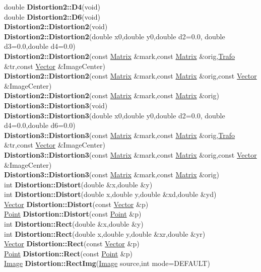 \documentclass[10pt,titlepage]{article}
\def\functionlistentry#1#2#3#4#5#6{\noindent #1 {\bf #2}(#3) \dotfill #6\\}
\begin{document}
{{\functionlistentry{double}{Distortion2::D4}{void}{757}{geoTrafo}{}
\functionlistentry{double}{Distortion2::D6}{void}{758}{geoTrafo}{}
\functionlistentry{}{Distortion2::Distortion2}{void}{730}{geoTrafo}{}
\functionlistentry{}{Distortion2::Distortion2}{double x0,double y0,double d2=0.0, double d3=0.0,double d4=0.0}{734}{geoTrafo}{}
\functionlistentry{}{Distortion2::Distortion2}{const \hyperlink{Matrix}{Matrix} \&mark,const \hyperlink{Matrix}{Matrix} \&orig,\hyperlink{Trafo}{Trafo} \&tr,const \hyperlink{Vector}{Vector} \&ImageCenter}{742}{geoTrafo}{}
\functionlistentry{}{Distortion2::Distortion2}{const \hyperlink{Matrix}{Matrix} \&mark,const \hyperlink{Matrix}{Matrix} \&orig,const \hyperlink{Vector}{Vector} \&ImageCenter}{743}{geoTrafo}{}
\functionlistentry{}{Distortion2::Distortion2}{const \hyperlink{Matrix}{Matrix} \&mark,const \hyperlink{Matrix}{Matrix} \&orig}{744}{geoTrafo}{}
\functionlistentry{}{Distortion3::Distortion3}{void}{731}{geoTrafo}{}
\functionlistentry{}{Distortion3::Distortion3}{double x0,double y0,double d2=0.0, double d4=0.0,double d6=0.0}{735}{geoTrafo}{}
\functionlistentry{}{Distortion3::Distortion3}{const \hyperlink{Matrix}{Matrix} \&mark,const \hyperlink{Matrix}{Matrix} \&orig,\hyperlink{Trafo}{Trafo} \&tr,const \hyperlink{Vector}{Vector} \&ImageCenter}{745}{geoTrafo}{}
\functionlistentry{}{Distortion3::Distortion3}{const \hyperlink{Matrix}{Matrix} \&mark,const \hyperlink{Matrix}{Matrix} \&orig,const \hyperlink{Vector}{Vector} \&ImageCenter}{746}{geoTrafo}{}
\functionlistentry{}{Distortion3::Distortion3}{const \hyperlink{Matrix}{Matrix} \&mark,const \hyperlink{Matrix}{Matrix} \&orig}{747}{geoTrafo}{}
\functionlistentry{int}{Distortion::Distort}{double \&x,double \&y}{759}{geoTrafo}{}
\functionlistentry{int}{Distortion::Distort}{double x,double y,double \&xd,double \&yd}{760}{geoTrafo}{}
\functionlistentry{\hyperlink{Vector}{Vector}}{Distortion::Distort}{const \hyperlink{Vector}{Vector} \&p}{761}{geoTrafo}{}
\functionlistentry{\hyperlink{Point}{Point}}{Distortion::Distort}{const \hyperlink{Point}{Point} \&p}{762}{geoTrafo}{}
\functionlistentry{int}{Distortion::Rect}{double \&x,double \&y}{763}{geoTrafo}{}
\functionlistentry{int}{Distortion::Rect}{double x,double y,double \&xr,double \&yr}{764}{geoTrafo}{}
\functionlistentry{\hyperlink{Vector}{Vector}}{Distortion::Rect}{const \hyperlink{Vector}{Vector} \&p}{765}{geoTrafo}{}
\functionlistentry{\hyperlink{Point}{Point}}{Distortion::Rect}{const \hyperlink{Point}{Point} \&p}{766}{geoTrafo}{}
\functionlistentry{\hyperlink{Image}{Image}}{Distortion::RectImg}{\hyperlink{Image}{Image} source,int mode=DEFAULT}{767}{geoTrafo}{}
}}
\end{document}

